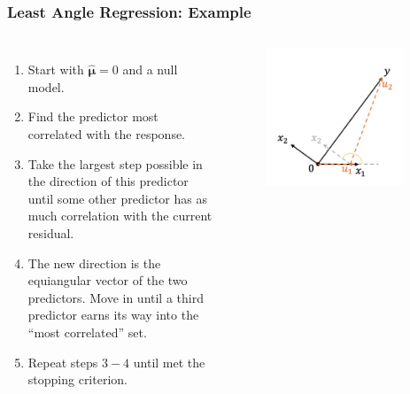 \begin{frame}
\frametitle{Least Angle Regression: Example}
\begin{columns}[t]
    \begin{enumerate}
        \item Start with $\hat{\mathbf{\mu}}=0$ and a null model.
        \item Find the predictor most correlated with the response.
        \item Take the largest step possible in the direction of this predictor until some other predictor has as much correlation with the current residual.
        \item The new direction is the equiangular vector of the two predictors. Move in until a third predictor earns its way into the ``most correlated'' set.
        \item Repeat steps $3-4$ until met the stopping criterion.
    \end{enumerate}
    
    \begin{figure}[!htbp]
        \begin{center}
            \includegraphics[width=0.9\textwidth]{img/LAR/4.jpeg}
        \end{center}
    \end{figure}
\end{columns}
\end{frame}

